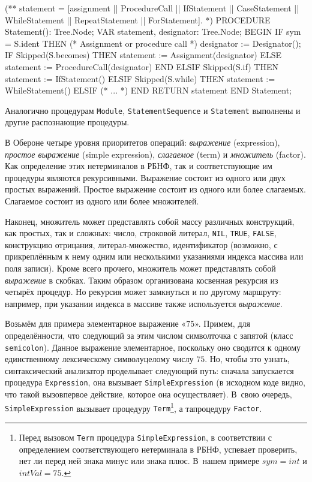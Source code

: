 \documentclass[utf8]{lgu}
\newcommand{\tire}{\unskip\nobreak\thinspace\textemdash\thinspace}
\newcommand{\code}[1]{{\normalsize\texttt{#1}}}
\newcommand{\codef}[1]{{\scriptsize\texttt{#1}}}
\begin{document}
\begin{listing}[H]
\caption{Распознающая процедура для оператора}
\vspace{-17pt}
\label{lst:Parser:Statement}
\begin{modula2}
(** statement = [assignment |\textbar| ProcedureCall |\textbar| IfStatement |\textbar|
    CaseStatement |\textbar| WhileStatement |\textbar| RepeatStatement |\textbar|
    ForStatement]. *)
PROCEDURE Statement(): Tree.Node;
VAR statement, designator: Tree.Node;
BEGIN
  IF sym = S.ident THEN (* Assignment or procedure call *)
    designator := Designator();
    IF Skipped(S.becomes) THEN
      statement := Assignment(designator)
    ELSE
      statement := ProcedureCall(designator)
    END
  ELSIF Skipped(S.if) THEN
    statement := IfStatement()
  ELSIF Skipped(S.while) THEN
    statement := WhileStatement()
  ELSIF
    (* ... *)
  END
RETURN statement END Statement;
\end{modula2}
\end{listing}

Аналогично процедурам \code{Module}, \code{StatementSequence} и \code{Statement} выполнены и другие распознающие процедуры.

В Обероне четыре уровня приоритетов операций: \textit{выражение} (expression), \textit{простое выражение} (simple expression), \textit{слагаемое} (term) и \textit{множитель} (factor). Как определение этих нетерминалов в РБНФ, так и соответствующие им процедуры являются рекурсивными. Выражение состоит из одного или двух простых выражений. Простое выражение состоит из одного или более слагаемых. Слагаемое состоит из одного или более множителей.

Наконец, множитель может представлять собой массу различных конструкций, как простых, так и сложных: число, строковой литерал, \code{NIL}, \code{TRUE}, \code{FALSE}, конструкцию отрицания, литерал-множество, идентификатор (возможно, с прикреплённым к нему одним или несколькими указаниями индекса массива или поля записи). Кроме всего прочего, множитель может представлять собой \textit{выражение} в скобках. Таким образом организована косвенная рекурсия из четырёх процедур. Но рекурсия может замкнуться и по другому маршруту: например, при указании индекса в массиве также используется \textit{выражение}.

Возьмём для примера элементарное выражение «$75$». Примем, для определённости, что следующий за этим числом символ\tire точка с запятой (класс \code{semicolon}). Данное выражение элементарное, поскольку оно сводится к одному единственному лексическому символу\tire целому числу $75$. Но, чтобы это узнать, синтаксический анализатор проделывает следующий путь: сначала запускается процедура \code{Expression}, она вызывает \code{SimpleExpression} (в исходном коде видно, что такой вызов\tire первое действие, которое она осуществляет). В~свою очередь, \code{SimpleExpression} вызывает процедуру \code{Term}\footnote{Перед вызовом \codef{Term} процедура \codef{SimpleExpression}, в соответствии с определением соответствующего нетерминала в РБНФ, успевает проверить, нет ли перед ней знака минус или знака плюс. В~нашем примере $\mathit{sym} = \mathit{int}$ и $\mathit{intVal} = 75$.}, а та\tire процедуру \code{Factor}.
\end{document}
